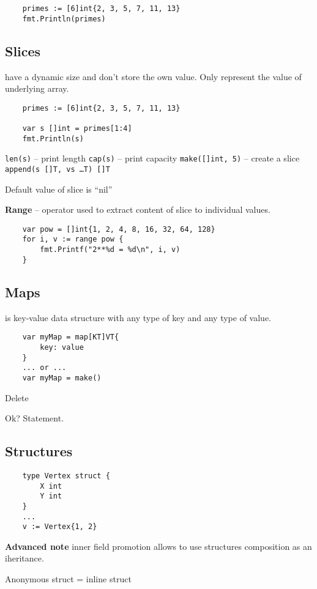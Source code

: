 \documentclass[12pt]{article}
\begin{document}
\begin{multicols}{2}
\begin{lstlisting}
    primes := [6]int{2, 3, 5, 7, 11, 13}
    fmt.Println(primes)
    \end{lstlisting}

    \subsection{Slices} have a dynamic size and don't store the own value.
    Only represent the value of underlying array.

    \begin{lstlisting}
    primes := [6]int{2, 3, 5, 7, 11, 13}

    var s []int = primes[1:4]
    fmt.Println(s)
    \end{lstlisting}

    \texttt{len(s)} -- print length
    \texttt{cap(s)} -- print capacity
    \texttt{make([]int, 5)} -- create a slice
    \texttt{append(s []T, vs \ldots T) []T}

    Default value of slice is ``nil''

    \textbf{Range} -- operator used to extract content of slice to individual values.

    \begin{lstlisting}
    var pow = []int{1, 2, 4, 8, 16, 32, 64, 128}
    for i, v := range pow {
        fmt.Printf("2**%d = %d\n", i, v)
    }
    \end{lstlisting}

    \subsection{Maps} is key-value data structure with any type of key and any type of value.
    \begin{lstlisting}
    var myMap = map[KT]VT{
        key: value
    }
    ... or ...
    var myMap = make()
    \end{lstlisting}

    Delete

    Ok? Statement.

    \subsection{Structures}

    \begin{lstlisting}
    type Vertex struct {
        X int
        Y int
    }
    ...
    v := Vertex{1, 2}
    \end{lstlisting}

    \begin{Note}
        \textbf{Advanced note} inner field promotion allows to use structures composition as an iheritance.
    \end{Note}

    Anonymous struct = inline struct
\end{multicols}
\end{document}
